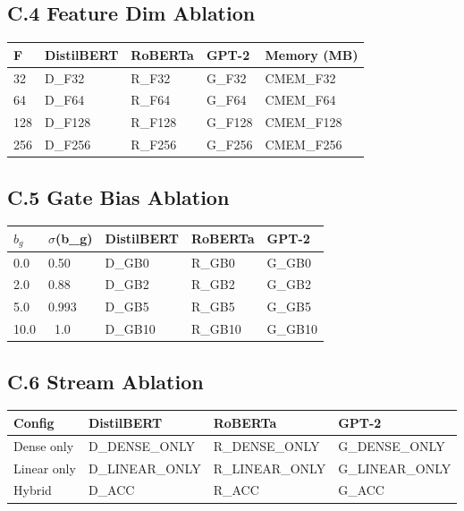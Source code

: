 \subsection{C.4 Feature Dim Ablation}

\begin{table}[H]
\centering
\small
\begin{tabular}{lllll}
\toprule
\textbf{F} & \textbf{DistilBERT} & \textbf{RoBERTa} & \textbf{GPT-2} & \textbf{Memory (MB)} \\
\midrule
32 & {{D\_F32}} & {{R\_F32}} & {{G\_F32}} & {{CMEM\_F32}} \\
64 & {{D\_F64}} & {{R\_F64}} & {{G\_F64}} & {{CMEM\_F64}} \\
128 & {{D\_F128}} & {{R\_F128}} & {{G\_F128}} & {{CMEM\_F128}} \\
256 & {{D\_F256}} & {{R\_F256}} & {{G\_F256}} & {{CMEM\_F256}} \\
\bottomrule
\end{tabular}
\end{table}

\subsection{C.5 Gate Bias Ablation}

\begin{table}[H]
\centering
\small
\begin{tabular}{lllll}
\toprule
\textbf{$b_g$} & \textbf{$\sigma$(b\_g)} & \textbf{DistilBERT} & \textbf{RoBERTa} & \textbf{GPT-2} \\
\midrule
0.0 & 0.50 & {{D\_GB0}} & {{R\_GB0}} & {{G\_GB0}} \\
2.0 & 0.88 & {{D\_GB2}} & {{R\_GB2}} & {{G\_GB2}} \\
5.0 & 0.993 & {{D\_GB5}} & {{R\_GB5}} & {{G\_GB5}} \\
10.0 & ~1.0 & {{D\_GB10}} & {{R\_GB10}} & {{G\_GB10}} \\
\bottomrule
\end{tabular}
\end{table}

\subsection{C.6 Stream Ablation}

\begin{table}[H]
\centering
\small
\begin{tabular}{llll}
\toprule
\textbf{Config} & \textbf{DistilBERT} & \textbf{RoBERTa} & \textbf{GPT-2} \\
\midrule
Dense only & {{D\_DENSE\_ONLY}} & {{R\_DENSE\_ONLY}} & {{G\_DENSE\_ONLY}} \\
Linear only & {{D\_LINEAR\_ONLY}} & {{R\_LINEAR\_ONLY}} & {{G\_LINEAR\_ONLY}} \\
Hybrid & {{D\_ACC}} & {{R\_ACC}} & {{G\_ACC}} \\
\bottomrule
\end{tabular}
\end{table}

